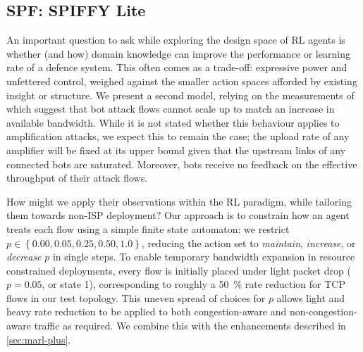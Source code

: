 \documentclass[conference, letterpaper, 10pt, times]{IEEEtran}
\begin{document}
\subsection{SPF: SPIFFY Lite}

An important question to ask while exploring the design space of RL agents is whether (and how) domain knowledge can improve the performance or learning rate of a defence system.
This often comes as a trade-off: expressive power and unfettered control, weighed against the smaller action spaces afforded by existing insight or structure.
We present a second model, relying on the measurements of \textcite{DBLP:conf/ndss/KangGS16} which suggest that bot attack flows cannot scale up to match an increase in available bandwidth.
While it is not stated whether this behaviour applies to amplification attacks, we expect this to remain the case; the upload rate of any amplifier will be fixed at its upper bound given that the upstream links of any connected bots are saturated.
Moreover, bots receive no feedback on the effective throughput of their attack flows.

How might we apply their observations within the RL paradigm, while tailoring them towards non-ISP deployment?
Our approach is to constrain how an agent treats each flow using a simple finite state automaton: we restrict $p \in \left\{ 0.00, 0.05, 0.25, 0.50, 1.0 \right\}$, reducing the action set to \emph{maintain}, \emph{increase}, or \emph{decrease} $p$ in single steps.
To enable temporary bandwidth expansion in resource constrained deployments, every flow is initially placed under light packet drop ($p=0.05$, or state 1), corresponding to roughly a \SI{50}{\percent} rate reduction for TCP flows in our test topology.
This uneven spread of choices for $p$ allows light and heavy rate reduction to be applied to both congestion-aware and non-congestion-aware traffic as required.
We combine this with the enhancements described in \cref{sec:marl-plus}.
\end{document}
